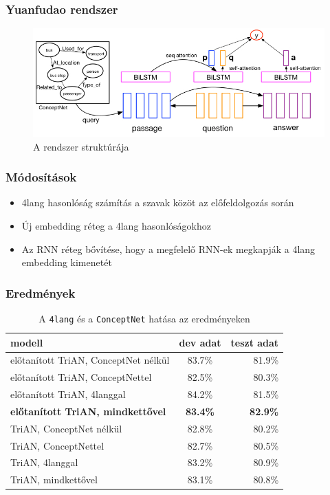 \documentclass[bigger]{beamer}
\begin{document}
\begin{frame}
	\frametitle{Yuanfudao rendszer}
	\begin{figure}[h!]
		\centering
		\includegraphics[scale=0.4]{pics/TriAN.jpg}
		\caption{A rendszer strukt\'ur\'aja}
		\label{fig:dnn}
	\end{figure}
\end{frame}
\begin{frame}
	\frametitle{M\'odos\'it\'asok}
	\begin{itemize}
		\pause \item 4lang hasonl\'os\'ag sz\'am\'it\'as a szavak k\"oz\"ot az el\H{o}feldolgoz\'as sor\'an
		\pause \item \'Uj embedding r\'eteg a 4lang hasonl\'os\'agokhoz
		\pause \item Az RNN r\'eteg b\H{o}v\'it\'ese, hogy a megfelel\H{o} RNN-ek megkapj\'ak a 4lang embedding kimenet\'et
	\end{itemize}
\end{frame}



\begin{frame}
	\frametitle{Eredm\'enyek}
	\begin{table}[h!]
		\centering
		\begin{tabular}{ | l | c | r | }
			\hline
			modell & dev adat & teszt adat \\ \hline \hline
			\pause el\H{o}tan\'itott TriAN, ConceptNet n\'elk\"ul & 83.7\% & 81.9\% \pause \\ \hline
			el\H{o}tan\'itott TriAN, ConceptNettel & 82.5\% & 80.3\% \pause \\ \hline
			el\H{o}tan\'itott TriAN, 4langgal & 84.2\% & 81.5\% \pause \\ \hline
			\textbf{el\H{o}tan\'itott TriAN, mindkett\H{o}vel} & \textbf{83.4\%} & \textbf{82.9\%} \pause \\ \hline
			TriAN, ConceptNet n\'elk\"ul & 82.8\% & 80.2\% \pause \\ \hline
			TriAN, ConceptNettel & 82.7\% & 80.5\% \pause \\ \hline
			TriAN, 4langgal & 83.2\% & 80.9\% \pause \\ \hline
			TriAN, mindkett\H{o}vel & 83.1\% & 80.8\% \\ \hline
		\end{tabular}
		\caption{A \texttt{4lang} \'es a \texttt{ConceptNet} hat\'asa az eredm\'enyeken}
		\label{tabl:res}
	\end{table}
\end{frame}
\end{document}

